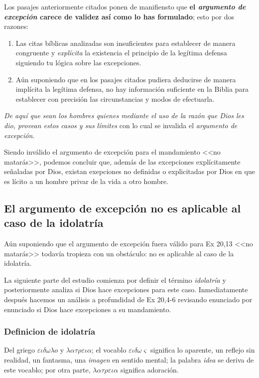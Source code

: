 \documentclass{article}
\begin{document}
Los pasajes anteriormente citados ponen de manifiensto que \textbf{el \emph{argumento de excepci\'on} carece de validez as\'{i} como lo has formulado}; esto por dos razones:

\begin{enumerate}
\item Las citas b\'{i}blicas analizadas son insuficientes para establecer de manera congruente y \emph{expl\'{i}cita} la existencia el principio de la leg\'{i}tima defensa siguiendo tu l\'ogica sobre las excepciones.
\item A\'un suponiendo que en los pasajes citados pudiera deducirse de manera impl\'{i}cita la leg\'{i}tima defensa, no hay informaci\'on suficiente en la Biblia para establecer con precisi\'on las circunstancias y modos de efectuarla.
\end{enumerate}

\noindent
\emph{De aqu\'{i} que sean los hombres quienes mediante el uso de la raz\'on que Dios les dio, provean estos casos y sus l\'{i}mites} con lo cual se invalida el \emph{argumento de excepci\'on}.

Siendo inv\'alido el argumento de excepci\'on para el mandamiento <<no matar\'as>>, podemos concluir que, adem\'as de las excepciones expl\'{i}citamente se\~naladas por Dios, existan exepciones no definidas o explicitadas por Dios en que es l\'{i}cito a un hombre privar de la vida a otro hombre.

\subsection{El argumento de excepci\'on no es aplicable al caso de la idolatr\'{i}a}

A\'un suponiendo que el argumento de excepci\'on fuera v\'alido para Ex 20,13 <<no matar\'as>> todav\'ia tropieza con un obst\'aculo: no es aplicable al caso de la idolatr\'{i}a.

La siguiente parte del estudio comienza por definir el t\'ermino \emph{idolatr\'{i}a} y posteriormente analiza si Dios hace excepciones para este caso. Inmediatamente despu\'es hacemos un an\'alisis a profundidad de Ex 20,4-6 revisando enunciado por enunciado si Dios hace excepciones a su mandamiento.

\subsubsection{Definicion de idolatr\'{i}a}

Del griego $\varepsilon\iota\delta\omega\lambda o$ y $\lambda\alpha\tau\rho\varepsilon\iota\alpha$; el vocablo $\varepsilon\iota\delta\omega\varsigma$ significa lo aparente, un reflejo sin realidad, un fantasma, una \emph{imagen} en sentido mental; la palabra \emph{idea} se deriva de este vocablo; por otra parte, $\lambda\alpha\tau\rho\varepsilon\iota\alpha$ significa adoraci\'on.
\end{document}
